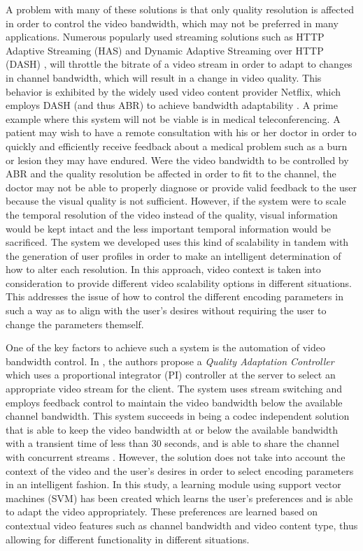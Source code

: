 \documentclass[a4paper,12pt]{article}
\begin{document}
A problem with many of these solutions is that only quality resolution is affected in order to control the video bandwidth, which may not be preferred in many applications. Numerous popularly used streaming solutions such as HTTP Adaptive Streaming (HAS) \cite{HASQoE} and Dynamic Adaptive Streaming over HTTP (DASH) \cite{DASH},  will throttle the bitrate of a video stream in order to adapt to changes in channel bandwidth, which will result in a change in video quality. This behavior is exhibited by the widely used video content provider Netflix, which employs DASH (and thus ABR) to achieve bandwidth adaptability \cite{Netflix}. A prime example where this system will not be viable is in medical teleconferencing. A patient may wish to have a remote consultation with his or her doctor in order to quickly and efficiently receive feedback about a medical problem such as a burn or lesion they may have endured. Were the video bandwidth to be controlled by ABR and the quality resolution be affected in order to fit to the channel, the doctor may not be able to properly diagnose or provide valid feedback to the user because the visual quality is not sufficient. However, if the system were to scale the temporal resolution of the video instead of the quality, visual information would be kept intact and the less important temporal information would be sacrificed. The system we developed uses this kind of scalability in tandem with the generation of user profiles in order to make an intelligent determination of how to alter each resolution. In this approach, video context is taken into consideration to provide different video scalability options in different situations. This addresses the issue of how to control the different encoding parameters in such a way as to align with the user’s desires without requiring the user to change the parameters themself.

One of the key factors to achieve such a system is the automation of video bandwidth control. In \cite{FeedbackControl}, the authors propose a \emph{Quality Adaptation Controller} which uses a proportional integrator (PI) controller at the server to select an appropriate video stream for the client. The system uses stream switching and employs feedback control to maintain the video bandwidth below the available channel bandwidth. This system succeeds in being a codec independent solution that is able to keep the video bandwidth at or below the available bandwidth with a transient time of less than 30 seconds, and is able to share the channel with concurrent streams \cite{FeedbackControl}. However, the solution does not take into account the context of the video and the user’s desires in order to select encoding parameters in an intelligent fashion. In this study, a learning module using support vector machines (SVM) has been created which learns the user’s preferences and is able to adapt the video appropriately. These preferences are learned based on contextual video features such as channel bandwidth and video content type, thus allowing for different functionality in different situations.
\end{document}
